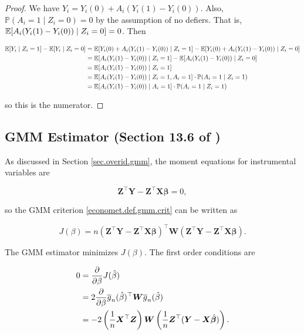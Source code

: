 \begin{proof}

We have \(Y_i = Y_i(0) + A_i(Y_i(1) - Y_i(0))\). Also, \(\mathbb{P}(A_i = 1 \mid Z_i = 0) = 0\) by the assumption of no defiers. That is, \(\E[ A_i(Y_i(1) - Y_i(0)) \mid Z_i = 0] = 0\). Then

\begin{align*}
\E[Y_i \mid Z_i = 1] - \E[Y_i \mid Z_i = 0] & = \E[Y_i(0) + A_i(Y_i(1) - Y_i(0)) \mid Z_i = 1] - \E[Y_i(0) + A_i(Y_i(1) - Y_i(0)) \mid Z_i = 0] 
\\ & = \E[ A_i(Y_i(1) - Y_i(0)) \mid Z_i = 1] - \E[ A_i(Y_i(1) - Y_i(0)) \mid Z_i = 0] 
\\ & = \E[ A_i(Y_i(1) - Y_i(0)) \mid Z_i = 1]
\\ & = \E[ A_i(Y_i(1) - Y_i(0)) \mid Z_i = 1, A_i = 1] \cdot \mathbb{P}(A_i = 1 \mid Z_i = 1)
\\ & = \E[ A_i(Y_i(1) - Y_i(0)) \mid  A_i = 1] \cdot \mathbb{P}(A_i = 1 \mid Z_i = 1)
\end{align*}

so this is the numerator.

\end{proof}

\subsection{GMM Estimator (Section 13.6 of \citet{hansen2020})}

As discussed in Section \ref{sec.overid.gmm}, the moment equations for instrumental variables are 

\[
\boldsymbol{Z}^\top \boldsymbol{Y} - \boldsymbol{Z}^\top \boldsymbol{X} \boldsymbol{\beta} = 0,
\]

so the GMM criterion \eqref{economet.def.gmm.crit} can be written as

\[
J(\beta) = n \left( \boldsymbol{Z}^\top \boldsymbol{Y} - \boldsymbol{Z}^\top \boldsymbol{X} \boldsymbol{\beta}\right)^\top \boldsymbol{W} \left(\boldsymbol{Z}^\top \boldsymbol{Y} - \boldsymbol{Z}^\top \boldsymbol{X} \boldsymbol{\beta}\right).
\]

The GMM estimator minimizes \(J(\beta)\). The first order conditions are

\begin{align*}
0 & = \pderiv{}{\beta} J(\hat{\beta})
\\ & = 2 \pderiv{}{\beta} \overline{g}_n(\hat{\beta})^\top \boldsymbol{W} \overline{g}_n(\hat{\beta})
\\ & = -2 \left(\frac{1}{n} \boldsymbol{X}^\top \boldsymbol{Z} \right)\boldsymbol{W}  \left( \frac{1}{n} \boldsymbol{Z}^\top (\boldsymbol{Y} - \boldsymbol{X} \hat{\boldsymbol{\beta}} )\right).
\end{align*}

